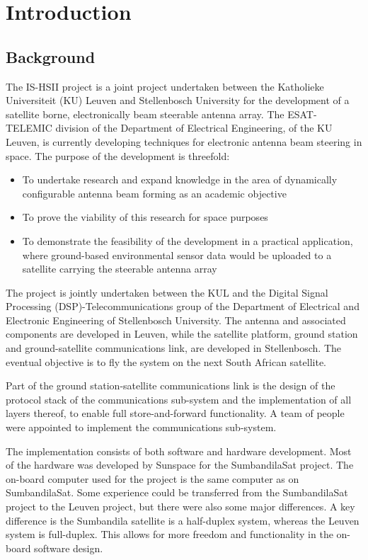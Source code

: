 \chapter{Introduction}
\label{chp:INTRO}


\section{Background}
\label{background}

The IS-HSII project is a joint project undertaken between the Katholieke Universiteit (KU) Leuven and Stellenbosch
University for the development of a satellite borne, electronically beam steerable antenna array. The
ESAT-TELEMIC division of the Department of Electrical Engineering, of the KU Leuven, is currently developing
techniques for electronic antenna beam steering in space. The purpose of the development is threefold:
\begin{itemize}
\item To undertake research and expand knowledge in the area of dynamically configurable antenna beam
forming as an academic objective
\item To prove the viability of this research for space purposes
\item To demonstrate the feasibility of the development in a practical application, where ground-based
environmental sensor data would be uploaded to a satellite carrying the steerable antenna array
\end{itemize}

The project is jointly undertaken between the KUL and the Digital Signal Processing (DSP)-Telecommunications group of the Department
of Electrical and Electronic Engineering of Stellenbosch University. The antenna and
associated components are developed in Leuven, while the satellite platform, ground station and
ground-satellite communications link, are developed in Stellenbosch. The eventual objective is to fly the
system on the next South African satellite.

Part of the ground station-satellite communications link is the design of the protocol stack of the
communications sub-system and the implementation of all layers thereof, to enable full store-and-forward functionality.
A team of people were appointed to implement the communications sub-system.

The implementation consists of both software and hardware development. Most of the hardware was developed
by Sunspace for the SumbandilaSat project. The on-board computer used for the project is the same
computer as on SumbandilaSat. Some experience could be transferred from the SumbandilaSat project to the Leuven
project, but there were also some major differences. A key difference is the Sumbandila satellite is
a half-duplex system, whereas the Leuven system is full-duplex. This allows for more freedom and functionality
in the on-board software design.

